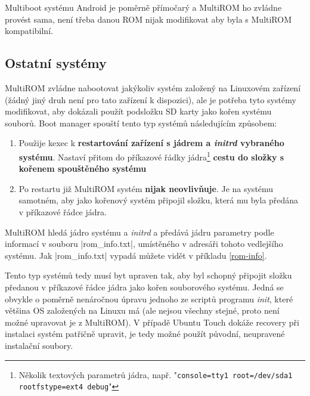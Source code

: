 \documentclass[12pt, a4paper, oneside]{article}
\newcommand{\B}{\textbf} %
\newcommand{\It}{\textit}  %
\begin{document}
Multiboot systému Android je poměrně přímočarý a MultiROM ho zvládne provést sama, není třeba danou ROM nijak modifikovat aby byla s MultiROM kompatibilní.

\subsection{Ostatní systémy}
MultiROM zvládne nabootovat jakýkoliv systém založený na Linuxovém zařízení (žádný jiný druh není pro tato zařízení k dispozici), ale je potřeba tyto systémy modifikovat, aby dokázali použít podsložku SD karty jako kořen systému souborů. Boot manager spouští tento typ systémů následujícím způsobem:
\begin{enumerate}
    \item Použije kexec k \B{restartování zařízení s jádrem a \It{initrd} vybraného systému}. Nastaví přitom do příkazové řádky jádra\footnote{Několik textových parametrů jádra, např. "\verb-console=tty1 root=/dev/sda1 rootfstype=ext4 debug-"} \B{cestu do složky s kořenem spouštěného systému}
    \item Po restartu již MultiROM systém \B{nijak neovlivňuje}. Je na systému samotném, aby jako kořenový systém připojil složku, která mu byla předána v příkazové řádce jádra.
\end{enumerate}

MultiROM hledá jádro systému a \It{initrd} a předává jádru parametry podle informací v souboru |rom_info.txt|, umístěného v adresáři tohoto vedlejšího systému. Jak |rom_info.txt| vypadá můžete vidět v příkladu \ref{rom-info}.

Tento typ systémů tedy musí byt upraven tak, aby byl schopný připojit složku předanou v příkazové řádce jádra jako kořen souborového systému. Jedná se obvykle o poměrně nenáročnou úpravu jednoho ze scriptů programu \It{init}, které většina OS založených na Linuxu má (ale nejsou všechny stejné, proto není možné upravovat je z MultiROM). V případě Ubuntu Touch dokáže recovery při instalaci systém patřičně upravit, je tedy možné použít původní, neupravené instalační soubory.
\end{document}
